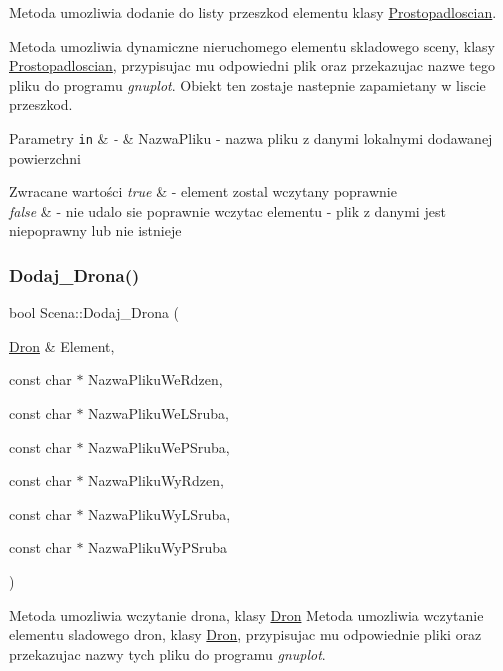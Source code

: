 Metoda umozliwia dodanie do listy przeszkod elementu klasy \hyperlink{classProstopadloscian}{Prostopadloscian}. 

Metoda umozliwia dynamiczne nieruchomego elementu skladowego sceny, klasy \hyperlink{classProstopadloscian}{Prostopadloscian}, przypisujac mu odpowiedni plik oraz przekazujac nazwe tego pliku do programu {\itshape gnuplot}. Obiekt ten zostaje nastepnie zapamietany w liscie przeszkod. 
\begin{DoxyParams}[1]{Parametry}
\mbox{\tt in}  & {\em -\/} & Nazwa\+Pliku -\/ nazwa pliku z danymi lokalnymi dodawanej powierzchni \\
\hline
\end{DoxyParams}

\begin{DoxyRetVals}{Zwracane wartości}
{\em true} & -\/ element zostal wczytany poprawnie \\
\hline
{\em false} & -\/ nie udalo sie poprawnie wczytac elementu -\/ plik z danymi jest niepoprawny lub nie istnieje \\
\hline
\end{DoxyRetVals}
\mbox{\label{classScena_ae4a2e4ac47a7d7183c3dd868d592a649}} 
\subsubsection{\texorpdfstring{Dodaj\+\_\+\+Drona()}{Dodaj\_Drona()}}
{\footnotesize\ttfamily bool Scena\+::\+Dodaj\+\_\+\+Drona (\begin{DoxyParamCaption}\item[{\hyperlink{classDron}{Dron} \&}]{Element,  }\item[{const char $\ast$}]{Nazwa\+Pliku\+We\+Rdzen,  }\item[{const char $\ast$}]{Nazwa\+Pliku\+We\+L\+Sruba,  }\item[{const char $\ast$}]{Nazwa\+Pliku\+We\+P\+Sruba,  }\item[{const char $\ast$}]{Nazwa\+Pliku\+Wy\+Rdzen,  }\item[{const char $\ast$}]{Nazwa\+Pliku\+Wy\+L\+Sruba,  }\item[{const char $\ast$}]{Nazwa\+Pliku\+Wy\+P\+Sruba }\end{DoxyParamCaption})}



Metoda umozliwia wczytanie drona, klasy \hyperlink{classDron}{Dron} Metoda umozliwia wczytanie elementu sladowego dron, klasy \hyperlink{classDron}{Dron}, przypisujac mu odpowiednie pliki oraz przekazujac nazwy tych pliku do programu {\itshape gnuplot}. 



